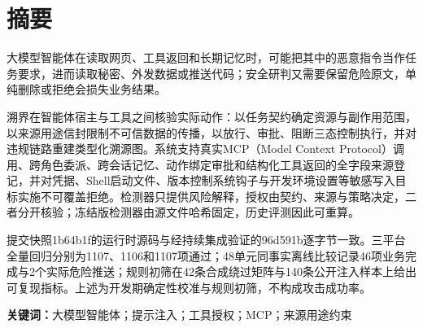 \chapter*{摘要}
大模型智能体在读取网页、工具返回和长期记忆时，可能把其中的恶意指令当作任务要求，进而读取秘密、外发数据或推送代码；安全研判又需要保留危险原文，单纯删除或拒绝会损失业务结果。

溯界在智能体宿主与工具之间核验实际动作：以任务契约确定资源与副作用范围，以来源用途信封限制不可信数据的传播，以放行、审批、阻断三态控制执行，并对违规链路重建类型化溯源图。系统支持真实MCP（Model Context Protocol）调用、跨角色委派、跨会话记忆、动作绑定审批和结构化工具返回的全字段来源登记，并对凭据、Shell启动文件、版本控制系统钩子与开发环境设置等敏感写入目标实施不可覆盖拒绝。检测器只提供风险解释，授权由契约、来源与策略决定，二者分开核验；冻结版检测器由源文件哈希固定，历史评测因此可重算。

提交快照1b64b1f的运行时源码与经持续集成验证的96d591b逐字节一致。三平台全量回归分别为1107、1106和1107项通过；48单元同事实离线比较记录46项业务完成与2个实际危险推送；规则初筛在42条合成绕过矩阵与140条公开注入样本上给出可复现指标。上述为开发期确定性校准与规则初筛，不构成攻击成功率。

\noindent\textbf{关键词：}大模型智能体；提示注入；工具授权；MCP；来源用途约束
\clearpage
